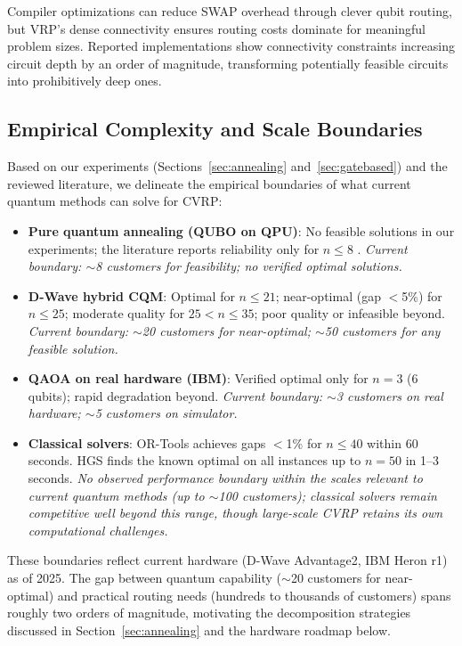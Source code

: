 \documentclass[preprint,3p,12pt,authoryear]{elsarticle}
\begin{document}
Compiler optimizations can reduce SWAP overhead through clever qubit routing, but VRP's dense connectivity ensures routing costs dominate for meaningful problem sizes. Reported implementations show connectivity constraints increasing circuit depth by an order of magnitude, transforming potentially feasible circuits into prohibitively deep ones.

{\color{red}\subsection{Empirical Complexity and Scale Boundaries}

Based on our experiments (Sections~\ref{sec:annealing} and~\ref{sec:gatebased}) and the reviewed literature, we delineate the empirical boundaries of what current quantum methods can solve for CVRP:

\begin{itemize}
\item \textbf{Pure quantum annealing (QUBO on QPU)}: No feasible solutions in our experiments; the literature reports reliability only for $n \leq 8$ \citep{jain2021solving}. \emph{Current boundary: $\sim$8 customers for feasibility; no verified optimal solutions.}

\item \textbf{D-Wave hybrid CQM}: Optimal for $n \leq 21$; near-optimal (gap $<$5\%) for $n \leq 25$; moderate quality for $25 < n \leq 35$; poor quality or infeasible beyond. \emph{Current boundary: $\sim$20 customers for near-optimal; $\sim$50 customers for any feasible solution.}

\item \textbf{QAOA on real hardware (IBM)}: Verified optimal only for $n = 3$ (6 qubits); rapid degradation beyond. \emph{Current boundary: $\sim$3 customers on real hardware; $\sim$5 customers on simulator.}

\item \textbf{Classical solvers}: OR-Tools achieves gaps $<$1\% for $n \leq 40$ within 60 seconds. HGS finds the known optimal on all instances up to $n = 50$ in 1--3 seconds. \emph{No observed performance boundary within the scales relevant to current quantum methods (up to $\sim$100 customers); classical solvers remain competitive well beyond this range, though large-scale CVRP retains its own computational challenges.}
\end{itemize}

These boundaries reflect current hardware (D-Wave Advantage2, IBM Heron r1) as of 2025. The gap between quantum capability ($\sim$20 customers for near-optimal) and practical routing needs (hundreds to thousands of customers) spans roughly two orders of magnitude, motivating the decomposition strategies discussed in Section~\ref{sec:annealing} and the hardware roadmap below.}
\end{document}
